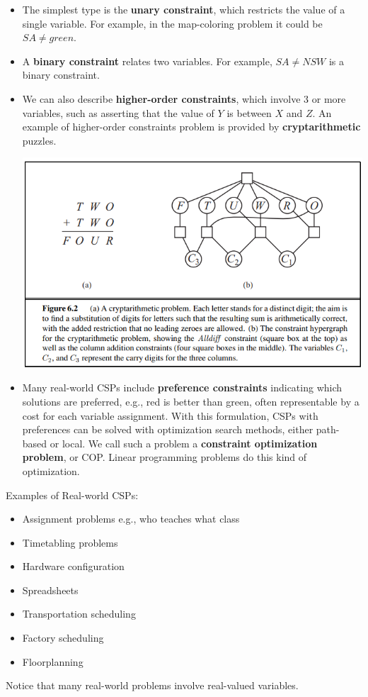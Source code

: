\begin{itemize}
    \item The simplest type is the \textbf{unary constraint}, which restricts the value of a single variable. For example, in the map-coloring problem it could be $SA \neq green$.

    \item A \textbf{binary constraint} relates two variables. For example, $SA \neq NSW$ is a binary constraint.

    \item  We can also describe \textbf{higher-order constraints}, which involve 3 or more variables, such as asserting that the value of $Y$ is between $X$ and $Z$. An example of higher-order constraints problem is provided by \textbf{cryptarithmetic} puzzles.
    \begin{center}
        \includegraphics[scale=0.8]{images/CSP-ca.png}
    \end{center}

    \item  Many real-world CSPs include \textbf{preference constraints} indicating which solutions are preferred,  e.g., red is better than green, often representable by a cost for each variable assignment. With this formulation, CSPs with preferences can be solved with optimization search methods, either path-based or local. We call such a problem a \textbf{constraint optimization problem}, or COP. Linear programming problems do this kind of optimization.
\end{itemize}
Examples of Real-world CSPs:
\begin{itemize}
    \item Assignment problems e.g., who teaches what class
    \item Timetabling problems
    \item Hardware configuration
    \item Spreadsheets
    \item Transportation scheduling
    \item Factory scheduling
    \item Floorplanning
\end{itemize}
Notice that many real-world problems involve real-valued variables.


